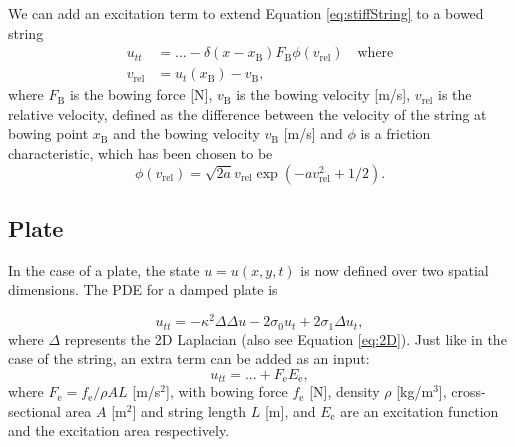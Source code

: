 \documentclass{article}
\begin{document}
We can add an excitation term to extend Equation \eqref{eq:stiffString} to a bowed string \cite{Bilbao2009:NumericalSoundSynthesis} 
\begin{align}
    \label{eq:bowedString} u_{tt} &= ... - \delta(x-x_\text{B})F_\text{B}\phi(v_\text{rel}) \quad \text{where} \\
    v_\text{rel} &= u_t(x_\text{B}) - v_\text{B},
\end{align}
where $F_\text{B}$ is the bowing force [N], $v_\text{B}$ is the bowing velocity [m/s], $v_\text{rel}$ is the relative velocity, defined as the difference between the velocity of the string at bowing point $x_\text{B}$ and the bowing velocity $v_\text{B}$ [m/s] and $\phi$ is a friction characteristic, which has been chosen to be \cite{Bilbao2009:NumericalSoundSynthesis}
\begin{equation}
    \phi(v_\text{rel}) = \sqrt{2a}v_\text{rel} \exp(-av_\text{rel}^2+1/2).
\end{equation}

\subsection{Plate}\label{subsec:platePDE}
In the case of a plate, the state $u = u(x,y,t)$ is now defined over two spatial dimensions. The PDE for a damped plate is \cite{Bilbao2009:NumericalSoundSynthesis}

\begin{equation}\label{eq:platePDE}
    u_{tt} = -\kappa^2 \Delta\Delta u - 2 \sigma_0 u_{t} + 2\sigma_1 \Delta u_{t},
\end{equation}
where $\Delta$ represents the 2D Laplacian (also see Equation \eqref{eq:2D}). Just like in the case of the string, an extra term can be added as an input:
\begin{equation}\label{eq:plateExcitation}
    u_{tt} = ... + F_\text{e}E_\text{e},
\end{equation}
where $F_\text{e} = f_\text{e}/ \rho AL$ [m/s$^2$], with bowing force $f_\text{e}$ [N], density $\rho$ [kg/m$^3$], cross-sectional area $A$ [m$^2$] and string length $L$ [m], and $E_\text{e}$ are an excitation function and the excitation area respectively. 
\end{document}
